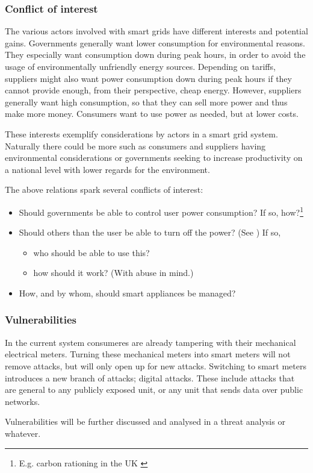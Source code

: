 \subsubsection{Conflict of interest}
The various actors involved with smart grids have different interests and potential gains.
Governments generally want lower consumption for environmental reasons.
They especially want consumption down during peak hours, in order to avoid the usage of environmentally unfriendly energy sources.
Depending on tariffs, suppliers might also want power consumption down during peak hours if they cannot provide enough, from their perspective, cheap energy.
However, suppliers generally want high consumption, so that they can sell more power and thus make more money.
Consumers want to use power as needed, but at lower costs.

These interests exemplify considerations by actors in a smart grid system.
Naturally there could be more such as consumers and suppliers having environmental considerations or governments seeking to increase productivity on a national level with lower regards for the environment.

The above relations spark several conflicts of interest:
\begin{itemize}
	\item Should governments be able to control user power consumption? If so, how?\footnote{E.g. carbon rationing in the UK \cite{security_economics}}
	\item Should others than the user be able to turn off the power? (See \cite{offswitch}) If so,
	\begin{itemize}
		\item who should be able to use this?
		\item how should it work? (With abuse in mind.)
	\end{itemize}
	\item How, and by whom, should smart appliances be managed?
\end{itemize}

\subsubsection{Vulnerabilities}
In the current system consumeres are already tampering  with their mechanical electrical meters.
Turning these mechanical meters into smart meters will not remove attacks, but will only open up for new attacks.
Switching to smart meters introduces a new branch of attacks; digital attacks.
These include attacks that are general to any publicly exposed unit, or any unit that sends data over public networks.

Vulnerabilities will be further discussed and analysed in a threat analysis or whatever.
